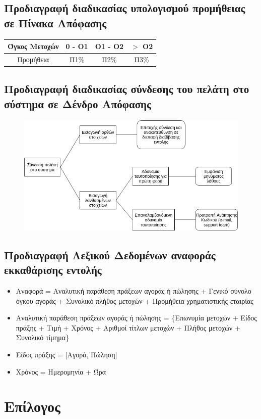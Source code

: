 \documentclass{article}
\begin{document}
\newpage
\subsection{Προδιαγραφή διαδικασίας υπολογισμού προμήθειας σε Πίνακα Απόφασης}
\begin{center}
\addtolength\tabcolsep{5pt}
\begin{tabular}{ ||c|ccc|| } 
	 \hline
	 Όγκος Μετοχών & 0 - O1 & O1 - O2 & $>$ O2 \\
	 \hline
	 Προμήθεια & Π1\% & Π2\% & Π3\%\\  
	 \hline
\end{tabular}
\end{center}

\subsection{Προδιαγραφή διαδικασίας σύνδεσης του πελάτη στο σύστημα σε Δένδρο Απόφασης}

\begin{figure}[!h]
	\includegraphics[width=\linewidth]{../Structured_Analysis/Decision_Tree.png}
\end{figure}

\subsection{Προδιαγραφή Λεξικού Δεδομένων αναφοράς εκκαθάρισης εντολής}
\begin{itemize}
\item Αναφορά = Αναλυτική παράθεση πράξεων αγοράς ή πώλησης + Γενικό σύνολο όγκου αγοράς + 
Συνολικό πλήθος μετοχών + Προμήθεια χρηματιστικής εταιρίας
\item Αναλυτική παράθεση πράξεων αγοράς ή πώλησης = \{Επωνυμία μετοχών + Είδος πράξης + Τιμή
 + Χρόνος + Αριθμοί τίτλων μετοχών + Πλήθος μετοχών + Συνολικό τίμημα\}
\item Είδος πράξης = [Αγορά, Πώληση]
\item Χρόνος = Ημερομηνία + Ώρα
\end{itemize}

\newpage
\section{Επίλογος}
\end{document}
